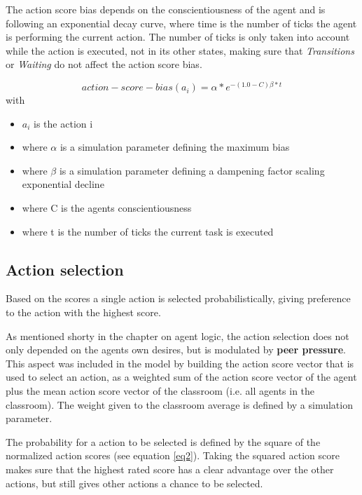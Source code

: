 \bb

The action score bias depends on the conscientiousness of the agent and is following an
exponential decay curve, where time is the number of ticks the agent is performing
the current action. The number of ticks is only taken into account while the action is executed,
not in its other states, making sure that \textit{Transitions} or \textit{Waiting}
do not affect the action score bias.

\begin{equation}
    \label{eq1}
    action-score-bias(a_i) = \alpha * e^{-(1.0 - C) \beta * t}
\end{equation}
with
\begin{itemize}
    \item $a_i$ is the action i
    \item where $\alpha$ is a simulation parameter defining the maximum bias
    \item where $\beta$ is a simulation parameter defining a dampening factor scaling exponential decline
    \item where C is the agents conscientiousness
    \item where t is the number of ticks the current task is executed
\end{itemize}

\subsection{Action selection}
Based on the scores a single action is selected probabilistically, giving preference
to the action with the highest score.

\bb

As mentioned shorty in the chapter on agent logic, the action selection does not only
depended on the agents own desires, but is modulated by \textbf{peer pressure}.
This aspect was included in the model by building the action score vector that is
used to select an action, as a weighted sum of the action score vector of the agent
plus the mean action score vector of the classroom (i.e. all agents in the classroom).
The weight given to the classroom average is defined by a simulation parameter.

\bb

The probability for a action to be selected is defined by the square of the normalized
action scores (see equation \ref{eq2}). Taking the squared action score makes sure
that the highest rated score has a clear advantage over the other actions, but still
gives other actions a chance to be selected.

